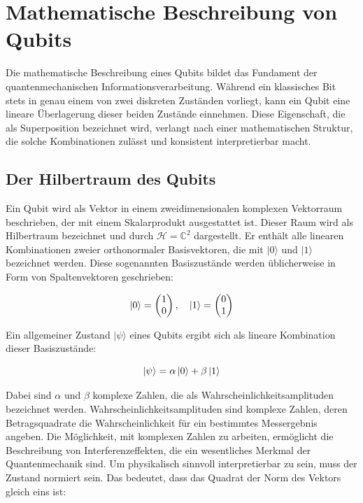 \section{Mathematische Beschreibung von Qubits}
\label{Mathematische Beschreibung von Qubits}

Die mathematische Beschreibung eines Qubits bildet das Fundament der quantenmechanischen Informationsverarbeitung. Während ein klassisches Bit stets in genau einem von zwei diskreten Zuständen vorliegt, kann ein Qubit eine lineare Überlagerung dieser beiden Zustände einnehmen. Diese Eigenschaft, die als Superposition bezeichnet wird, verlangt nach einer mathematischen Struktur, die solche Kombinationen zulässt und konsistent interpretierbar macht.

\subsection{Der Hilbertraum des Qubits}
\label{subsec: Der Hilbertraum des Qubits}

Ein Qubit wird als Vektor in einem zweidimensionalen komplexen Vektorraum beschrieben, der mit einem Skalarprodukt ausgestattet ist. Dieser Raum wird als Hilbertraum bezeichnet und durch \( \mathcal{H} = \mathbb{C}^2 \) dargestellt. Er enthält alle linearen Kombinationen zweier orthonormaler Basisvektoren, die mit \( |0\rangle \) und \( |1\rangle \) bezeichnet werden. Diese sogenannten Basiszustände werden üblicherweise in Form von Spaltenvektoren geschrieben:

\[
\ket{0} = \begin{pmatrix} 1 \\ 0 \end{pmatrix}, \quad \ket{1} = \begin{pmatrix} 0 \\ 1 \end{pmatrix}
\]

Ein allgemeiner Zustand \( |\psi\rangle \) eines Qubits ergibt sich als lineare Kombination dieser Basiszustände:

\[
\ket{\psi} = \alpha \ket{0} + \beta \ket{1} 
\]

Dabei sind \( \alpha \) und \( \beta \) komplexe Zahlen, die als Wahrscheinlichkeitsamplituden bezeichnet werden. Wahrscheinlichkeitsamplituden sind komplexe Zahlen, deren Betragsquadrate die Wahrscheinlichkeit für ein bestimmtes Messergebnis angeben. Die Möglichkeit, mit komplexen Zahlen zu arbeiten, ermöglicht die Beschreibung von Interferenzeffekten, die ein wesentliches Merkmal der Quantenmechanik sind. Um physikalisch sinnvoll interpretierbar zu sein, muss der Zustand normiert sein. Das bedeutet, dass das Quadrat der Norm des Vektors gleich eins ist:

